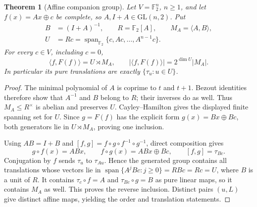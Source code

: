 \documentclass[11pt]{article}
\newtheorem{theorem}{Theorem}[section]
\begin{document}
\begin{theorem}[Affine companion group]\label{thm:affine-group}
Let $V=\mathbb F_2^n$, $n\ge1$, and let $f(x)=Ax\oplus c$ be complete,
so $A,I+A\in\mathrm{GL}(n,2)$. Put
\[
\begin{aligned}
B&=(I+A)^{-1},\qquad R=\mathbb F_2[A],\qquad M_A=\langle A,B\rangle,\\
U&=Rc=\operatorname{span}_{\mathbb F_2}\{c,Ac,\ldots,A^{n-1}c\}.
\end{aligned}
\]
For every $c\in V$, including $c=0$,
\[
\langle f,F(f)\rangle=U\rtimes M_A,
\qquad |\langle f,F(f)\rangle|=2^{\dim U}|M_A|.
\]
In particular its pure translations are exactly $\{\tau_u:u\in U\}$.
\end{theorem}
\begin{proof}
The minimal polynomial of $A$ is coprime to $t$ and $t+1$.
Bezout identities therefore show that $A^{-1}$ and $B$ belong to $R$;
their inverses do as well. Thus $M_A\le R^\times$ is abelian and preserves $U$.
Cayley--Hamilton gives the displayed finite spanning set for $U$.
Since $g=F(f)$ has the explicit form $g(x)=Bx\oplus Bc$, both generators
lie in $U\rtimes M_A$, proving one inclusion.

Using $AB=I+B$ and $[f,g]=f\circ g\circ f^{-1}\circ g^{-1}$,
direct composition gives
\[
g\circ f(x)=ABx,\qquad
f\circ g(x)=ABx\oplus Bc,\qquad [f,g]=\tau_{Bc}.
\]
Conjugation by $f$ sends $\tau_u$ to $\tau_{Au}$.
Hence the generated group contains all translations whose vectors lie in
$\operatorname{span}\{A^jBc:j\ge0\}=RBc=Rc=U$, where $B$ is a unit of $R$.
It contains $\tau_c\circ f=A$ and $\tau_{Bc}\circ g=B$ as pure linear maps,
so it contains $M_A$ as well. This proves the reverse inclusion.
Distinct pairs $(u,L)$ give distinct affine maps, yielding the order and
translation statements.
\end{proof}
\end{document}
